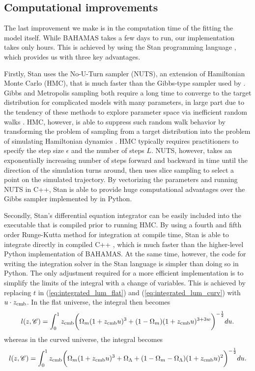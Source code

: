 \subsection{Computational improvements}
\label{sec:ode_integration}

The last improvement we make is in the computation time of the fitting the model itself. While BAHAMAS takes a few days to run, our implementation takes only hours. This is achieved by using the Stan programming language \citep{Stan:2016}, which provides us with three key advantages. 

Firstly, Stan uses the \citet{Hoffman+others:2014} No-U-Turn sampler (NUTS), an extension of Hamiltonian Monte Carlo (HMC), that is much faster than the Gibbs-type sampler used by \citet{Shariff+others:2016}. Gibbs and Metropolis sampling both require a long time to converge to the target distribution for complicated models with many parameters, in large part due to the tendency of these methods to explore parameter space via inefficient random walks \citep{Neal:1993}. HMC, however, is able to suppress such random walk behavior by transforming the problem of sampling from a target distribution into the problem of simulating Hamiltonian dynamics \citep{Neal:2011}. HMC typically requires practitioners to specify the step size $\epsilon$ and the number of steps $L$. NUTS, however, takes an exponentially increasing number of steps forward and backward in time until the direction of the simulation turns around, then uses slice sampling \citep{Neal:2003} to select a point on the simulated trajectory. By vectorizing the parameters and running NUTS in C++, Stan is able to provide huge computational advantages over the Gibbs sampler implemented by \citet{Shariff+others:2016} in Python.

Secondly, Stan's differential equation integrator can be easily included into the executable that is compiled prior to running HMC. By using a fourth and fifth order Runge-Kutta method \citep{Dormand+others:1980} for integration at compile time, Stan is able to integrate directly in compiled C++ \citep{Ahnert+others:2011}, which is much faster than the higher-level Python implementation of BAHAMAS. At the same time, however, the code for writing the integration solver in the Stan language is simpler than doing so in Python. The only adjustment required for a more efficient implementation is to simplify the limits of the integral with a change of variables. This is achieved by replacing $t$ in (\ref{eq:integrated_lum_flat}) and (\ref{eq:integrated_lum_curv}) with $u \cdot z_{\text{cmb}}$. In the flat universe, the integral then becomes
\begin{align}
l(z, \mathcal{C}) = \int_0^1 z_{\text{cmb}} \biggl( \Omega_m(1 + z_{\text{cmb}} u)^3 + (1 - \Omega_m) (1 + z_{\text{cmb}} u)^{3 + 3w} \biggr)^{-\frac{1}{2}} du. 
\end{align}
whereas in the curved universe, the integral becomes
\begin{align}
l(z, \mathcal{C}) = \int_0^1 z_{\text{cmb}} \biggl( \Omega_m(1 + z_{\text{cmb}} u)^3 + \Omega_\Lambda + (1- \Omega_m - \Omega_\Lambda) (1 + z_{\text{cmb}} u)^2 \biggr)^{-\frac{1}{2}} du.
\end{align}

